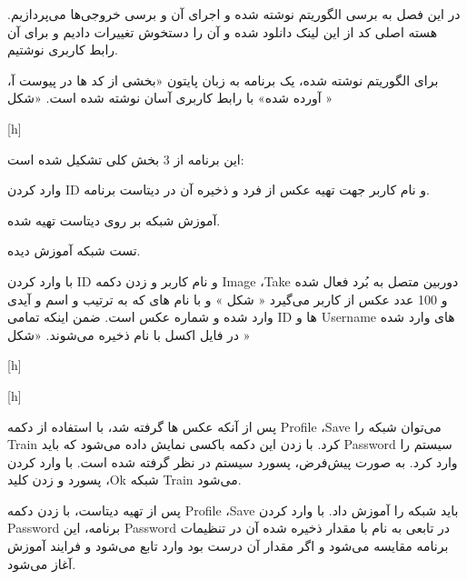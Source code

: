 

در این فصل به برسی الگوریتم نوشته شده و اجرای آن و برسی خروجی‌ها می‌پردازیم. هسته اصلی کد از این لینک دانلود شده و آن را دستخوش تغییرات دادیم و برای آن رابط کاربری نوشتیم.

برای الگوریتم نوشته شده، یک برنامه به زبان پایتون «بخشی از کد‌ ها در پیوست آ،  آورده شده» با رابط کاربری آسان نوشته شده است. «شکل »


[h]

این برنامه از 3 بخش کلی تشکیل شده است:


وارد کردن ID و نام کاربر جهت تهیه عکس از فرد و ذخیره آن در دیتاست برنامه.

آموزش شبکه بر روی دیتاست تهیه شده.

تست شبکه آموزش دیده.


با وارد کردن ID و نام کاربر و زدن دکمه Image ،Take دوربین متصل به بُرد فعال شده و 100 عدد عکس از کاربر می‌گیرد
« شکل » و با نام های  که به ترتیب  و  اسم و آیدی وارد شده و  شماره عکس است. ضمن اینکه تمامی ID ها و Username های وارد شده در فایل اکسل با نام  ذخیره می‌شوند. «شکل »

[h]

[h]

پس از آنکه عکس ها گرفته شد، با استفاده از دکمه Profile ،Save می‌توان شبکه را Train کرد. با زدن این دکمه باکسی نمایش داده می‌شود که باید Password سیستم را وارد کرد. به صورت پیش‌فرض، پسورد سیستم  در نظر گرفته شده است. با وارد کردن پسورد و زدن کلید ،Ok شبکه Train می‌شود.

پس از تهیه دیتاست، با زدن دکمه Profile ،Save باید شبکه را آموزش داد. با وارد کردن Password برنامه، این Password در تابعی به نام  با مقدار ذخیره شده آن در تنظیمات برنامه مقایسه می‌شود و اگر مقدار آن درست بود وارد تابع  می‌شود و فرایند آموزش آغاز می‌شود.

